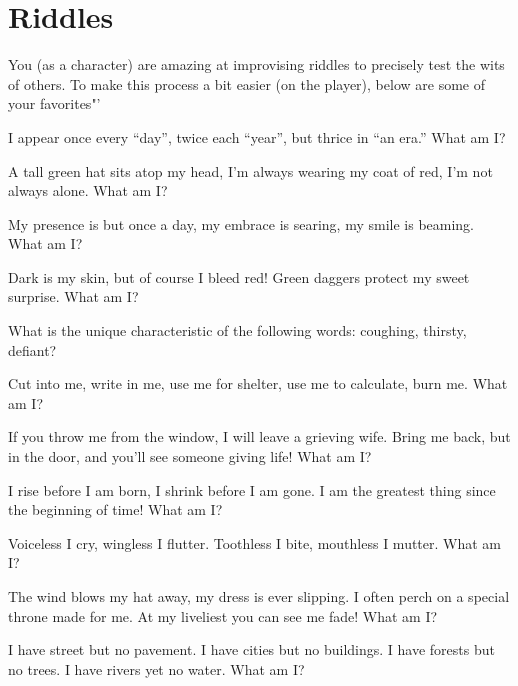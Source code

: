 \documentclass[green]{guildcamp2}
\begin{document}
\name{\gsphinxriddles{}}

\section{Riddles}
You (as a character) are amazing at improvising riddles to precisely test the wits of others. To make this process a bit easier (on the player), below are some of your favorites"'

\begin{enum}
	\item I appear once every ``day'', twice each ``year'', but thrice in ``an era.'' What am I?
	
	\item A tall green hat sits atop my head, I'm always wearing my coat of red, I'm not always alone. What am I?
	
	\item My presence is but once a day, my embrace is searing, my smile is beaming. What am I?
	
	\item Dark is my skin, but of course I bleed red! Green daggers protect my sweet surprise. What am I?
	
	\item What is the unique characteristic of the following words: coughing, thirsty, defiant?
	
	\item Cut into me, write in me, use me for shelter, use me to calculate, burn me. What am I?
	
	\item If you throw me from the window, I will leave a grieving wife. Bring me back, but in the door, and you'll see someone giving life! What am I?
	
	\item I rise before I am born, I shrink before I am gone. I am the greatest thing since the beginning of time! What am I?
	
	\item Voiceless I cry, wingless I flutter. Toothless I bite, mouthless I mutter. What am I?
	
	\item The wind blows my hat away, my dress is ever slipping. I often perch on a special throne made for me. At my liveliest you can see me fade! What am I?
	
	\item I have street but no pavement. I have cities but no buildings. I have forests but no trees. I have rivers yet no water. What am I?
	

\end{enum}
\end{document}
